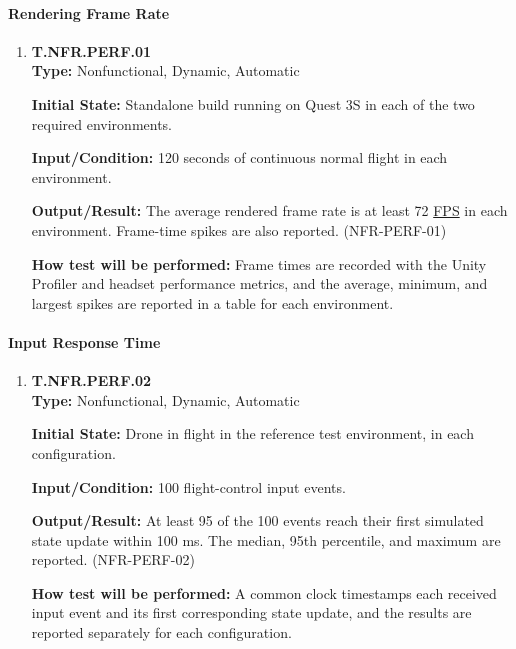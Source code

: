 \documentclass[12pt, titlepage]{article}
\begin{document}
{\sloppy
\paragraph{Rendering Frame Rate}

\begin{enumerate}

\item{\hypertarget{test-nfr-perf-01}{}\textbf{T.NFR.PERF.01}\\}
\textbf{Type:} Nonfunctional, Dynamic, Automatic

\textbf{Initial State:} Standalone build running on Quest 3S in each of the two required
environments.

\textbf{Input/Condition:} 120 seconds of continuous normal flight in each environment.

\textbf{Output/Result:} The average rendered frame rate is at least 72 \hyperlink{abbr:FPS}{FPS} in each
environment. Frame-time spikes are also reported. (\mbox{NFR-PERF-01})

\textbf{How test will be performed:} Frame times are recorded with the Unity Profiler
and headset performance metrics, and the average, minimum, and largest spikes are
reported in a table for each environment.

\end{enumerate}

\paragraph{Input Response Time}

\begin{enumerate}

\item{\hypertarget{test-nfr-perf-02}{}\textbf{T.NFR.PERF.02}\\}
\textbf{Type:} Nonfunctional, Dynamic, Automatic

\textbf{Initial State:} Drone in flight in the reference test environment, in each
configuration.

\textbf{Input/Condition:} 100 flight-control input events.

\textbf{Output/Result:} At least 95 of the 100 events reach their first simulated state
update within 100 ms. The median, 95th percentile, and maximum are reported.
(\mbox{NFR-PERF-02})

\textbf{How test will be performed:} A common clock timestamps each received input event
and its first corresponding state update, and the results are reported separately for
each configuration.

\end{enumerate}
\par}
\end{document}
